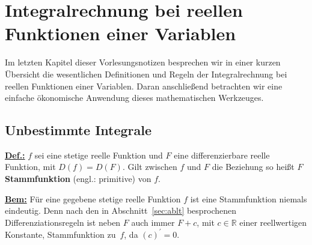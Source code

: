 \chapter[Integralrechnung bei reellen Funktionen]%
{Integralrechnung bei reellen Funktionen einer Variablen}
\hfill\hbox{}

\vspace{10mm}
\noindent
Im letzten Kapitel dieser Vorlesungsnotizen besprechen wir in
einer kurzen \"Ubersicht die wesentlichen Definitionen und Regeln
der Integralrechnung bei reellen Funktionen einer Variablen. Daran
anschlie\ss end betrachten wir eine einfache \"okonomische
Anwendung dieses mathematischen Werkzeuges.

\section[Unbestimmte Integrale]{Unbestimmte Integrale}
\underline{\bf Def.:} $f$ sei eine stetige reelle Funktion und
$F$ eine differenzierbare reelle Funktion, mit $D(f)=D(F)$. Gilt
zwischen $f$ und $F$ die Beziehung
%
\be
{}
\ee
%
so hei\ss t $F$ {\bf Stammfunktion} (engl.: primitive) von $f$.

\medskip
\noindent
\underline{\bf Bem:} F\"ur eine gegebene stetige reelle
Funktion $f$ ist eine Stammfunktion niemals eindeutig. Denn nach
den in Abschnitt~\ref{sec:ablt} besprochenen
Differenziationsregeln ist neben $F$ auch immer $F+c$, mit
$c \in \mathbb{R}$ einer reellwertigen Konstante, Stammfunktion
zu~$f$, da $(c)^{\prime} = 0$.

